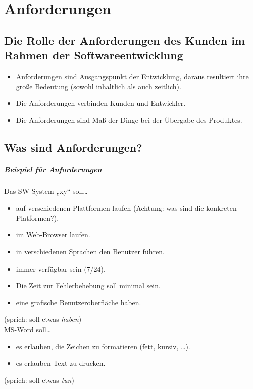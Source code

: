 \chapter{Anforderungen}

\section{Die Rolle der Anforderungen des Kunden im Rahmen der Softwareentwicklung}
\begin{itemize}
\item Anforderungen sind Ausgangspunkt der Entwicklung, daraus resultiert ihre große Bedeutung (sowohl inhaltlich als auch zeitlich).
\item Die Anforderungen verbinden Kunden und Entwickler.
\item Die Anforderungen sind Maß der Dinge bei der Übergabe des Produktes.
\end{itemize}

\section{Was sind Anforderungen?}
\paragraph{Beispiel für Anforderungen}
Das SW-System „xy“ soll…
\begin{itemize}
\item auf verschiedenen Plattformen laufen (Achtung: was sind die konkreten Platformen?).
\item im Web-Browser laufen.
\item in verschiedenen Sprachen den Benutzer führen.
\item immer verfügbar sein (7/24).
\item Die Zeit zur Fehlerbehebung soll minimal sein.
\item eine grafische Benutzeroberfläche haben.
\end{itemize}
(sprich: soll etwas \emph{haben})\bigskip\\
MS-Word soll…
\begin{itemize}
\item es erlauben, die Zeichen zu formatieren (fett, kursiv, …).
\item es erlauben Text zu drucken.
\end{itemize}
(sprich: soll etwas \emph{tun})
